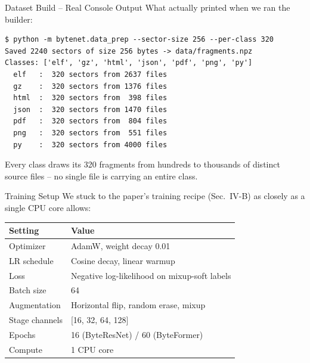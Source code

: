 \documentclass{beamer}
\begin{document}
\begin{frame}[fragile]{Dataset Build -- Real Console Output}
What actually printed when we ran the builder:
\begin{lstlisting}[style=term]
$ python -m bytenet.data_prep --sector-size 256 --per-class 320
Saved 2240 sectors of size 256 bytes -> data/fragments.npz
Classes: ['elf', 'gz', 'html', 'json', 'pdf', 'png', 'py']
  elf   :  320 sectors from 2637 files
  gz    :  320 sectors from 1376 files
  html  :  320 sectors from  398 files
  json  :  320 sectors from 1470 files
  pdf   :  320 sectors from  804 files
  png   :  320 sectors from  551 files
  py    :  320 sectors from 4000 files
\end{lstlisting}
Every class draws its 320 fragments from hundreds to thousands of
distinct source files -- no single file is carrying an entire class.
\end{frame}

\begin{frame}{Training Setup}
We stuck to the paper's training recipe (Sec.~IV-B) as closely as a
single CPU core allows:

\begin{center}
\begin{tabular}{ll}
\toprule
\textbf{Setting} & \textbf{Value} \\
\midrule
Optimizer & AdamW, weight decay 0.01 \\
LR schedule & Cosine decay, linear warmup \\
Loss & Negative log-likelihood on mixup-soft labels \\
Batch size & 64 \\
Augmentation & Horizontal flip, random erase, mixup \\
Stage channels & [16, 32, 64, 128] \\
Epochs & 16 (ByteResNet) / 60 (ByteFormer) \\
Compute & 1 CPU core \\
\bottomrule
\end{tabular}
\end{center}
\end{frame}
\end{document}
